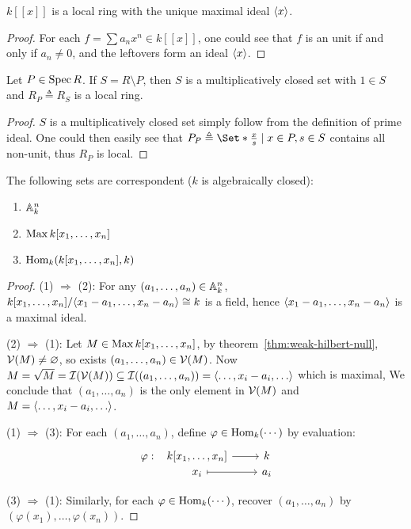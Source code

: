 \begin{example}
  $k[[x]]$ is a local ring with the unique maximal ideal $\langle x\rangle$.
  \begin{proof}
    For each $f = \sum a_n x^n \in k[[x]]$, one could see that $f$ is
    an unit if and only if $a_n \neq 0$, and the leftovers form an
    ideal $\langle x\rangle$.
  \end{proof}
\end{example}

\begin{example}
  Let $P \in \operatorname{Spec} R$. If $S = R \setminus P$, then $S$ is a multiplicatively
  closed set with $1 \in S$ and $R_P \triangleq R_S$ is a local ring.

  \begin{proof}
    $S$ is a multiplicatively closed set simply follow from the definition of prime ideal.
    One could then easily see that $P_P \triangleq \Set*{\frac{x}{s} \mid x \in P, s \in S}$
    contains all non-unit, thus $R_P$ is local.
  \end{proof}
\end{example}


\begin{prop}
  The following sets are correspondent ($k$ is algebraically closed):
  \begin{enumerate}[(1)]
    \item $\mathbb{A}_k^n$
    \item $\operatorname{Max} k[x_1, \dots, x_n]$
    \item $\operatorname{Hom}_k(k[x_1, \dots, x_n], k)$
  \end{enumerate}
  \begin{proof}
    (1) $\Rightarrow$ (2): For any $(a_1, \dots, a_n) \in \mathbb{A}_k^n$,
    $k[x_1, \dots, x_n] / \langle x_1 - a_1, \dots, x_n - a_n\rangle \cong k$ is a field,
    hence $\langle x_1 - a_1, \dots, x_n - a_n\rangle$ is a maximal ideal.

    (2) $\Rightarrow$ (1): Let $M \in \operatorname{Max} k[x_1, \dots, x_n]$,
    by theorem~\ref{thm:weak-hilbert-null}, $\mathcal{V}(M) \neq \varnothing$,
    so exists $(a_1, \dots, a_n) \in \mathcal{V}(M)$.
    Now $M = \sqrt{M} = \Ic(\Vc(M)) \subseteq \Ic((a_1, \dots, a_n)) = \gen{\dots, x_i - a_i, \dots}$
    which is maximal,
    We conclude that $(a_1, \dots, a_n)$ is the only element in $\mathcal{V}(M)$
    and $M = \gen{\dots, x_i - a_i, \dots}$.

    (1) $\Rightarrow$ (3): For each $(a_1, \dots, a_n)$, define $\varphi \in \operatorname{Hom}_k(\dotsm)$ by
    evaluation:
    \[
      \begin{tikzcd}[column sep=0.8cm,row sep=0ex]
        \varphi: &[-0.7cm] k[x_1, \dots, x_n] \arrow[r] & k \\
        & x_i \arrow[r, mapsto] & a_i
      \end{tikzcd}
    \]

    (3) $\Rightarrow$ (1): Similarly, for each $\varphi \in \operatorname{Hom}_k(\dotsm)$,
    recover $(a_1, \dots, a_n)$ by $(\varphi(x_1), \dots, \varphi(x_n))$.
  \end{proof}
\end{prop}

